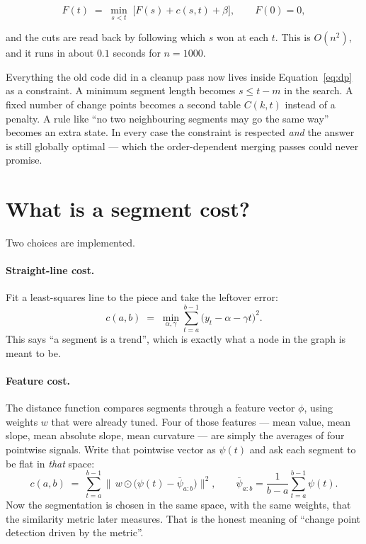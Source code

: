 \documentclass[11pt]{article}
\begin{document}
\begin{equation}
F(t) \;=\; \min_{s < t} \; \Big[ F(s) + c(s,t) + \beta \Big],
\qquad F(0) = 0,
\label{eq:dp}
\end{equation}

and the cuts are read back by following which $s$ won at each $t$. This is
$O(n^2)$, and it runs in about $0.1$ seconds for $n = 1000$.

Everything the old code did in a cleanup pass now lives inside
Equation~\eqref{eq:dp} as a constraint. A minimum segment length becomes
$s \le t - m$ in the search. A fixed number of change points becomes a second
table $C(k,t)$ instead of a penalty. A rule like ``no two neighbouring segments
may go the same way'' becomes an extra state. In every case the constraint is
respected \emph{and} the answer is still globally optimal --- which the
order-dependent merging passes could never promise.

\section{What is a segment cost?}

Two choices are implemented.

\paragraph{Straight-line cost.} Fit a least-squares line to the piece and take
the leftover error:
\begin{equation}
c(a,b) \;=\; \min_{\alpha,\gamma} \sum_{t=a}^{b-1} \big( y_t - \alpha - \gamma t \big)^2 .
\end{equation}
This says ``a segment is a trend'', which is exactly what a node in the graph is
meant to be.

\paragraph{Feature cost.} The distance function compares segments through a
feature vector $\phi$, using weights $w$ that were already tuned. Four of those
features --- mean value, mean slope, mean absolute slope, mean curvature --- are
simply the averages of four pointwise signals. Write that pointwise vector as
$\psi(t)$ and ask each segment to be flat in \emph{that} space:
\begin{equation}
c(a,b) \;=\; \sum_{t=a}^{b-1} \big\lVert\, w \odot \big( \psi(t) - \bar{\psi}_{a:b} \big) \big\rVert^2 ,
\qquad
\bar{\psi}_{a:b} = \frac{1}{b-a}\sum_{t=a}^{b-1} \psi(t).
\end{equation}
Now the segmentation is chosen in the same space, with the same weights, that
the similarity metric later measures. That is the honest meaning of ``change
point detection driven by the metric''.
\end{document}

